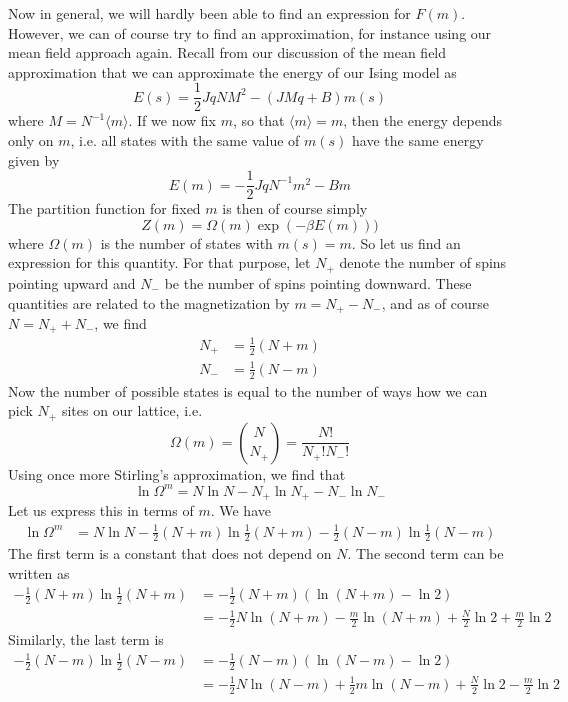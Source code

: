 \documentclass[a4paper, draft]{article}
\theoremstyle{own}
\theoremstyle{remark}
\begin{document}
Now in general, we will hardly been able to find an expression for $F(m)$. However, we can of course try to find an approximation, for instance using our mean field approach again. Recall from our discussion of the mean field approximation that we can approximate the energy of our Ising model as
$$
E(s) = \frac{1}{2} J q N M^2  - (J M q + B) m(s)
$$
where $M = N^{-1} \langle m \rangle $. If we now fix $m$, so that $\langle m \rangle = m$, then the energy depends only on $m$, i.e. all states with the same value of $m(s)$ have the same energy given by
$$
E(m) = - \frac{1}{2} J q N^{-1} m^2  - B m
$$
The partition function for fixed $m$ is then of course simply
$$
Z(m) = \Omega(m) \exp(-\beta E(m)))
$$
where $\Omega(m)$ is the number of states with $m(s) = m$. So let us find an expression for this quantity. For that purpose, let $N_+$ denote the number of spins pointing upward and $N_-$ be the number of spins pointing downward. These quantities are related to the magnetization by $m  = N_+ - N_-$, and as of course $N = N_+ + N_-$, we find
\begin{align*}
N_+ &= \frac{1}{2}(N + m) \\
N_- &= \frac{1}{2}(N - m)
\end{align*}
Now the number of possible states is equal to the number of ways how we can pick $N_+$ sites on our lattice, i.e.
$$
\Omega(m) = \binom{N}{N_+} = \frac{N!}{N_+! N_-!}
$$
Using once more Stirling's approximation, we find that
$$
\ln \Omega^m = N \ln N - N_+ \ln N_+ - N_- \ln N_-
$$
Let us express this in terms of $m$. We have
\begin{align*}	
\ln \Omega^m &= N \ln N - \frac{1}{2}(N + m) \ln \frac{1}{2}(N + m) - \frac{1}{2}(N - m) \ln \frac{1}{2}(N - m)
\end{align*}
The first term is a constant that does not depend on $N$. The second term can be written as
\begin{align*}
- \frac{1}{2}(N + m) \ln \frac{1}{2}(N + m) &= - \frac{1}{2}(N + m) (\ln (N + m) - \ln 2) \\
&= - \frac{1}{2} N \ln (N + m) - \frac{m}{2}  \ln (N + m) + \frac{N}{2}  \ln 2 + \frac{m}{2}  \ln 2
\end{align*}
Similarly, the last term is
\begin{align*}
	- \frac{1}{2}(N - m) \ln \frac{1}{2}(N - m) &= - \frac{1}{2}(N - m) (\ln (N - m) - \ln 2) \\
	&= - \frac{1}{2} N \ln (N - m) + \frac{1}{2} m \ln (N - m) + \frac{N}{2}  \ln 2 - \frac{m}{2}  \ln 2
\end{align*}
\end{document}
